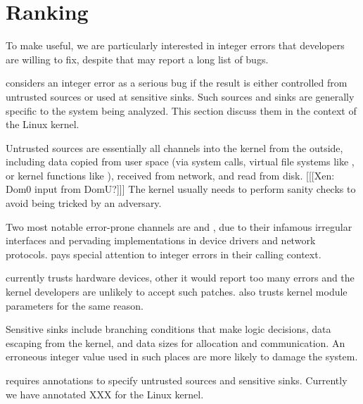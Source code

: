 \section{Ranking}

To make \sys useful, we are particularly interested in integer
errors that developers are willing to fix, despite that \sys may
report a long list of bugs.

\sys considers an integer error as a serious bug if the result is
either controlled from untrusted sources or used at sensitive sinks.
Such sources and sinks are generally specific to the system being
analyzed.  This section discuss them in the context of the Linux
kernel.

Untrusted sources are essentially all channels into the kernel from
the outside, including data copied from user space (via system
calls, virtual file systems like , or kernel functions
like ), received from network, and read from
disk. [[[Xen: Dom0 input from DomU?]]]
The kernel usually needs to perform sanity checks to avoid being
tricked by an adversary.

Two most notable error-prone channels are  and ,
due to their infamous irregular interfaces and pervading implementations
in device drivers and network protocols.  \sys pays special attention
to integer errors in their calling context.

\sys currently trusts hardware devices, other it would report too
many errors and the kernel developers are unlikely to accept such
patches.  \sys also trusts kernel module parameters for the same
reason.

Sensitive sinks include branching conditions that make logic
decisions, data escaping from the kernel, and data sizes for
allocation and communication.  An erroneous integer value used in
such places are more likely to damage the system.

\sys requires annotations to specify untrusted sources and sensitive
sinks.  Currently we have annotated XXX for the Linux kernel.
